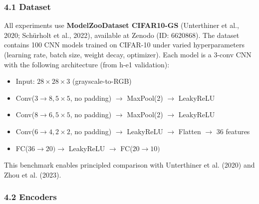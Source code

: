 
\subsubsection{4.1 Dataset}

All experiments use \textbf{ModelZooDataset CIFAR10-GS} (Unterthiner et al., 2020; Schürholt et al., 2022), available at Zenodo (ID: 6620868). The dataset contains 100 CNN models trained on CIFAR-10 under varied hyperparameters (learning rate, batch size, weight decay, optimizer). Each model is a 3-conv CNN with the following architecture (from h-e1 validation):

\begin{itemize}
\item Input: $28\times 28\times 3$ (grayscale-to-RGB)
\item Conv($3\rightarrow 8, 5\times 5$, no padding) $\rightarrow$ MaxPool(2) $\rightarrow$ LeakyReLU
\item Conv($8\rightarrow 6, 5\times 5$, no padding) $\rightarrow$ MaxPool(2) $\rightarrow$ LeakyReLU
\item Conv($6\rightarrow 4, 2\times 2$, no padding) $\rightarrow$ LeakyReLU $\rightarrow$ Flatten $\rightarrow$ 36 features
\item FC($36\rightarrow 20) \rightarrow$ LeakyReLU $\rightarrow$ FC($20\rightarrow 10)$
\end{itemize}

\begin{table}[htbp]
\centering
{}
\end{table}

This benchmark enables principled comparison with Unterthiner et al. (2020) and Zhou et al. (2023).

\subsubsection{4.2 Encoders}

